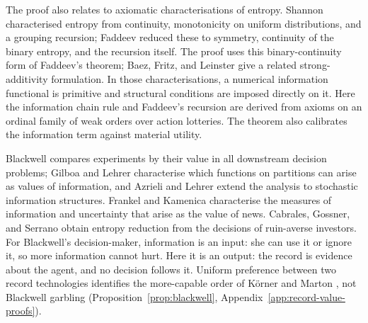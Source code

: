 \documentclass[11pt,a4paper]{article}
\theoremstyle{definition}
\newcommand{\1}{\mathbf 1}
\begin{document}
The proof also relates to axiomatic characterisations of entropy.  Shannon \cite{Shannon1948} characterised
entropy from continuity, monotonicity on uniform distributions, and a grouping recursion; Faddeev
\cite{Faddeev1956} reduced these to symmetry, continuity of the binary entropy, and the recursion itself.  The
proof uses this binary-continuity form of Faddeev's theorem; Baez, Fritz, and Leinster
\cite{BaezFritzLeinster2011} give a related strong-additivity formulation.
In those characterisations, a numerical information functional is primitive and structural conditions are
imposed directly on it. Here the information chain rule and Faddeev's recursion are derived from axioms on an ordinal family of weak orders over action lotteries. The theorem also calibrates the information term against material utility.

 Blackwell \cite{Blackwell1953} compares experiments by their value in all downstream decision problems; Gilboa
and Lehrer \cite{GilboaLehrer1991} characterise which functions on partitions can arise as values of information, and Azrieli and Lehrer \cite{AzrieliLehrer2008} extend the analysis to stochastic
information structures.  Frankel and Kamenica \cite{FrankelKamenica2019} characterise the measures of
information and uncertainty that arise as the value of news.  Cabrales, Gossner, and
Serrano \cite{CabralesGossnerSerrano2013} obtain entropy reduction from the decisions of ruin-averse investors.
For Blackwell's decision-maker, information is an input: she can use it or ignore it, so more
information cannot hurt.  Here it is an output: the record is evidence about the agent, and no
decision follows it.
Uniform preference between two record technologies identifies the more-capable
order of K\"orner and Marton \cite{KornerMarton1977}, not Blackwell garbling
(Proposition~\ref{prop:blackwell}, Appendix~\ref{app:record-value-proofs}).
\end{document}
